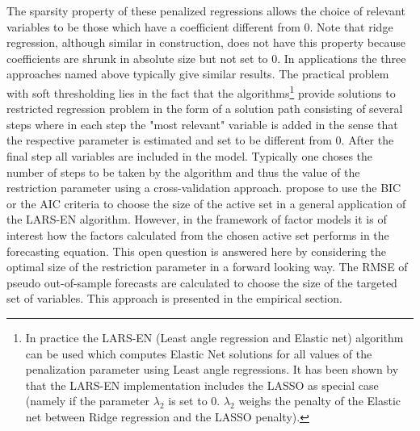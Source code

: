 \documentclass[12pt]{article}
\begin{document}
The sparsity property of these penalized regressions allows the choice of relevant variables to be those which have a coefficient different from $0$. Note that ridge regression, although similar in construction, does not have this property because coefficients are shrunk in absolute size but not set to $0$. In applications the three approaches named above typically give similar results.
The practical problem with soft thresholding lies in the fact that the algorithms\footnote{In practice the LARS-EN (Least angle regression and Elastic net) algorithm can be used which computes Elastic Net solutions for all values of the penalization parameter using Least angle regressions. It has been shown by \citet{efron_hastie_johnstone_tibshirani2004} that the LARS-EN implementation includes the LASSO as special case (namely if the parameter $\lambda_2$ is set to 0. $\lambda_2$ weighs the penalty of the Elastic net between Ridge regression and the LASSO penalty).} provide solutions to restricted regression problem in the form of a solution path consisting of several steps where in each step the "most relevant" variable is added in the sense that the respective parameter is estimated and set to be different from $0$. After the final step all variables are included in the model. Typically one choses the number of steps to be taken by the algorithm and thus the value of the restriction parameter using a cross-validation approach. \citet{bai2008forecasting} propose to use the BIC or the AIC criteria to choose the size of the active set in a general application of the LARS-EN algorithm. However, in the framework of factor models it is of interest how the factors calculated from the chosen active set performs in the forecasting equation. This open question is answered here by considering the optimal size of the restriction parameter in a forward looking way. The RMSE of pseudo out-of-sample forecasts are calculated to choose the size of the targeted set of variables. This approach is presented in the empirical section. \\
\end{document}
